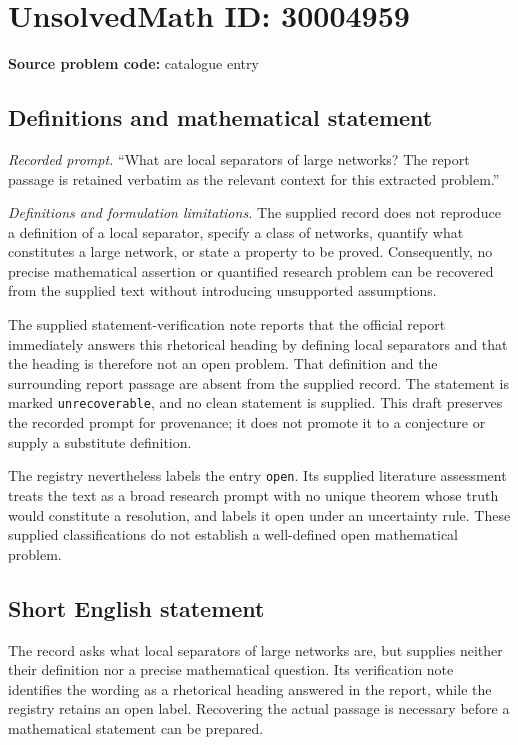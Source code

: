 \documentclass[11pt]{article}
\begin{document}
\section*{UnsolvedMath ID: 30004959}
\textbf{Source problem code:} catalogue entry
\subsection{Definitions and mathematical statement}
\emph{Recorded prompt.} ``What are local separators of large networks? The report passage is retained verbatim as the relevant context for this extracted problem.''

\emph{Definitions and formulation limitations.} The supplied record does not reproduce a definition of a local separator, specify a class of networks, quantify what constitutes a large network, or state a property to be proved. Consequently, no precise mathematical assertion or quantified research problem can be recovered from the supplied text without introducing unsupported assumptions.

The supplied statement-verification note reports that the official report immediately answers this rhetorical heading by defining local separators and that the heading is therefore not an open problem. That definition and the surrounding report passage are absent from the supplied record. The statement is marked \texttt{unrecoverable}, and no clean statement is supplied. This draft preserves the recorded prompt for provenance; it does not promote it to a conjecture or supply a substitute definition.

The registry nevertheless labels the entry \texttt{open}. Its supplied literature assessment treats the text as a broad research prompt with no unique theorem whose truth would constitute a resolution, and labels it open under an uncertainty rule. These supplied classifications do not establish a well-defined open mathematical problem.
\subsection{Short English statement}
The record asks what local separators of large networks are, but supplies neither their definition nor a precise mathematical question. Its verification note identifies the wording as a rhetorical heading answered in the report, while the registry retains an open label. Recovering the actual passage is necessary before a mathematical statement can be prepared.
\end{document}
